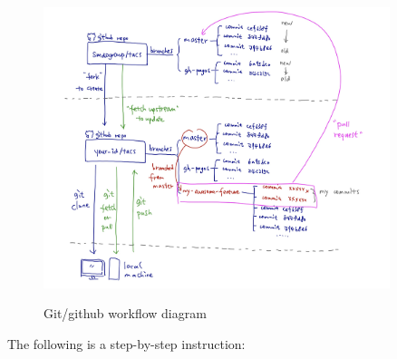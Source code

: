 \documentclass{article}
\begin{document}
\begin{figure}[h]
    \centering
    \includegraphics[width=0.9\textwidth]{pics/cartoon.jpg}
    \label{fig:cartoon}
    \caption{Git/github workflow diagram}
\end{figure}

The following is a step-by-step instruction:
\end{document}
